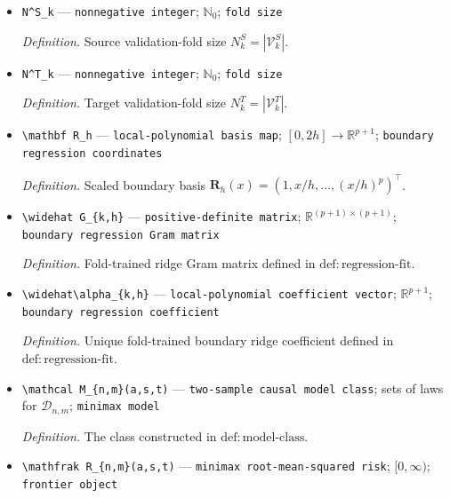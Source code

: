 \documentclass{article}
\begin{document}
\begin{itemize}
  \par\smallskip\noindent\emph{Definition.} Target validation fold \(\mathcal V^T_k=\{j:k_T(j)=k\}\).
  \item \texttt{N\textasciicircum{}S\_\allowbreak{}k} --- \texttt{nonnegative integer}; \(\mathbb N_0\); \texttt{fold size}
  \par\smallskip\noindent\emph{Definition.} Source validation-fold size \(N^S_k=|\mathcal V^S_k|\).
  \item \texttt{N\textasciicircum{}T\_\allowbreak{}k} --- \texttt{nonnegative integer}; \(\mathbb N_0\); \texttt{fold size}
  \par\smallskip\noindent\emph{Definition.} Target validation-fold size \(N^T_k=|\mathcal V^T_k|\).
  \item \texttt{\textbackslash{}\allowbreak{}mathbf R\_\allowbreak{}h} --- \texttt{local-\allowbreak{}polynomial basis map}; \([0,2h]\to\mathbb R^{p+1}\); \texttt{boundary regression coordinates}
  \par\smallskip\noindent\emph{Definition.} Scaled boundary basis \(\mathbf R_h(x)=(1,x/h,\ldots,(x/h)^p)^\top\).
  \item \texttt{\textbackslash{}\allowbreak{}widehat G\_\allowbreak{}\{k,\allowbreak{}h\}\allowbreak{}} --- \texttt{positive-\allowbreak{}definite matrix}; \(\mathbb R^{(p+1)\times(p+1)}\); \texttt{boundary regression Gram matrix}
  \par\smallskip\noindent\emph{Definition.} Fold-trained ridge Gram matrix defined in \(\mathrm{def:regression\text{-}fit}\).
  \item \texttt{\textbackslash{}\allowbreak{}widehat\textbackslash{}\allowbreak{}alpha\_\allowbreak{}\{k,\allowbreak{}h\}\allowbreak{}} --- \texttt{local-\allowbreak{}polynomial coefficient vector}; \(\mathbb R^{p+1}\); \texttt{boundary regression coefficient}
  \par\smallskip\noindent\emph{Definition.} Unique fold-trained boundary ridge coefficient defined in \(\mathrm{def:regression\text{-}fit}\).
  \item \texttt{\textbackslash{}\allowbreak{}mathcal M\_\allowbreak{}\{n,\allowbreak{}m\}\allowbreak{}(a,\allowbreak{}s,\allowbreak{}t)} --- \texttt{two-\allowbreak{}sample causal model class}; sets of laws for \(\mathcal D_{n,m}\); \texttt{minimax model}
  \par\smallskip\noindent\emph{Definition.} The class constructed in \(\mathrm{def:model\text{-}class}\).
  \item \texttt{\textbackslash{}\allowbreak{}mathfrak R\_\allowbreak{}\{n,\allowbreak{}m\}\allowbreak{}(a,\allowbreak{}s,\allowbreak{}t)} --- \texttt{minimax root-\allowbreak{}mean-\allowbreak{}squared risk}; \([0,\infty)\); \texttt{frontier object}

\end{itemize}
\end{document}
